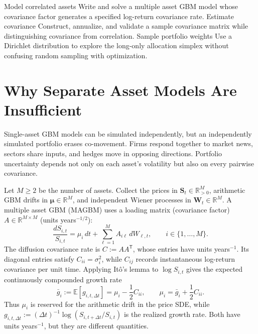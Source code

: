 \documentclass[11pt]{article}
\newcommand{\E}{\mathbb{E}}
\newcommand{\R}{\mathbb{R}}
\begin{document}

\learningobjectives
  {Model correlated assets}
  {Write and solve a multiple asset GBM model whose covariance factor generates a specified log-return covariance rate.}
  {Estimate covariance}
  {Construct, annualize, and validate a sample covariance matrix while distinguishing covariance from correlation.}
  {Sample portfolio weights}
  {Use a Dirichlet distribution to explore the long-only allocation simplex without confusing random sampling with optimization.}

\section{Why Separate Asset Models Are Insufficient}

Single-asset GBM models can be simulated independently, but an independently simulated portfolio erases co-movement. Firms respond together to market news, sectors share inputs, and hedges move in opposing directions. Portfolio uncertainty depends not only on each asset's volatility but also on every pairwise covariance.

Let $M\geq2$ be the number of assets. Collect the prices in $\mathbf{S}_t\in\R_{>0}^M$, arithmetic GBM drifts in $\boldsymbol\mu\in\R^M$, and independent Wiener processes in $\mathbf{W}_t\in\R^M$. A multiple asset GBM (MAGBM) uses a loading matrix (covariance factor) $A\in\R^{M\times M}$ (units years$^{-1/2}$):
\begin{equation}
  \label{eq:mgbm-sde}
  \frac{dS_{i,t}}{S_{i,t}}
  =\mu_i\,dt+\sum_{\ell=1}^{M}A_{i\ell}\,dW_{\ell,t},
  \qquad i\in\{1,\ldots,M\}.
\end{equation}
The diffusion covariance rate is $C:=AA^{\mathsf T}$, whose entries have units years$^{-1}$. Its diagonal entries satisfy $C_{ii}=\sigma_i^2$, while $C_{ij}$ records instantaneous log-return covariance per unit time. Applying It\^o's lemma to $\log S_{i,t}$ gives the expected continuously compounded growth rate
\begin{equation}
  \label{eq:drift-growth-relation}
  \bar g_i:=\E[g_{i,t,\Delta t}]
  =\mu_i-\frac12 C_{ii},
  \qquad
  \mu_i=\bar g_i+\frac12 C_{ii}.
\end{equation}
Thus $\mu_i$ is reserved for the arithmetic drift in the price SDE, while $g_{i,t,\Delta t}:=(\Delta t)^{-1}\log(S_{i,t+\Delta t}/S_{i,t})$ is the realized growth rate. Both have units years$^{-1}$, but they are different quantities.
\end{document}
